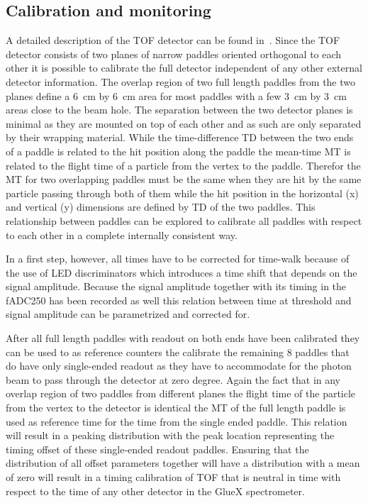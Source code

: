 \subsection{Calibration and monitoring \label{sec:sccalib}}
A detailed description of the TOF detector can be found in~\cite{GlueXTOFNIM}. Since the TOF detector consists of two
planes of narrow paddles oriented orthogonal to each other it is possible to calibrate the full detector independent
of any other external detector information. The overlap region of two full length paddles from the two planes define
a 6~cm by 6~cm area for most paddles with a few 3~cm by 3~cm areas close to the beam hole. The separation between
the two detector planes is minimal as they are mounted on top of each other and as such are only separated by their wrapping
material. While the time-difference TD between the two ends of a paddle is related to the hit position along the paddle
the mean-time MT is related to the flight time of a particle from the vertex to the paddle. Therefor the MT for two overlapping
paddles must be the same when they are hit by the same particle passing through both of them while the hit position in the horizontal (x) and vertical (y) dimensions are defined by TD of the two paddles. This relationship between paddles can be
explored to calibrate all paddles with respect to each other in a complete internally consistent way.

In a first step, however, all times have to be corrected for time-walk because of the use of LED discriminators which
introduces a time shift that depends on the signal amplitude. Because the signal amplitude together with its timing
in the fADC250 has been recorded as well this relation between time at threshold and signal amplitude can be parametrized and corrected for.

After all full length paddles with readout on both ends have been calibrated they can be used to as reference counters
the calibrate the remaining 8 paddles that do have only single-ended readout as they have to accommodate for the photon
beam to pass through the detector at zero degree. Again the fact that in any overlap region of two paddles from different
planes the flight time of the particle from the vertex to the detector is identical the MT of the full length paddle is used
as reference time for the time from the single ended paddle. This relation will result in a peaking distribution with the peak
location representing the timing offset of these single-ended readout paddles. Ensuring that the distribution of all offset
parameters together will have a distribution with a mean of zero will result in a timing calibration of TOF that is neutral
in time with respect to the time of any other detector in the GlueX spectrometer.

